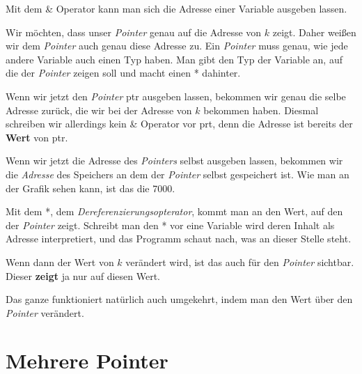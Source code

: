 \documentclass[c_worksheet.tex]{subfiles}
\begin{document}
Mit dem \& Operator kann man sich die Adresse einer Variable ausgeben lassen.

  

Wir möchten, dass unser \emph{Pointer} genau auf die Adresse von \(k\) zeigt. Daher weißen wir dem \emph{Pointer} auch genau diese Adresse zu. Ein \emph{Pointer} muss genau, wie jede andere Variable auch einen Typ haben. Man gibt den Typ der Variable an, auf die der \emph{Pointer} zeigen soll und macht einen * dahinter.

 

Wenn wir jetzt den \emph{Pointer} ptr ausgeben lassen, bekommen wir genau die selbe Adresse zurück, die wir bei der Adresse von \(k\) bekommen haben. Diesmal schreiben wir allerdings kein \& Operator vor prt, denn die Adresse ist bereits der \textbf{Wert} von ptr.

 

Wenn wir jetzt die Adresse des \emph{Pointers} selbst ausgeben lassen, bekommen wir die \emph{Adresse} des Speichers an dem der \emph{Pointer} selbst gespeichert ist. Wie man an der Grafik sehen kann, ist das die 7000.

 

Mit dem *, dem \emph{Dereferenzierungsopterator}, kommt man an den Wert, auf den der \emph{Pointer} zeigt. Schreibt man den * vor eine Variable wird deren Inhalt als Adresse interpretiert, und das Programm schaut nach, was an dieser Stelle steht.

 

Wenn dann der Wert von \(k\) verändert wird, ist das auch für den \emph{Pointer} sichtbar. Dieser \textbf{zeigt} ja nur auf diesen Wert.

 

Das ganze funktioniert natürlich auch umgekehrt, indem man den Wert über den \emph{Pointer} verändert.





\section{Mehrere Pointer} 
\end{document}
